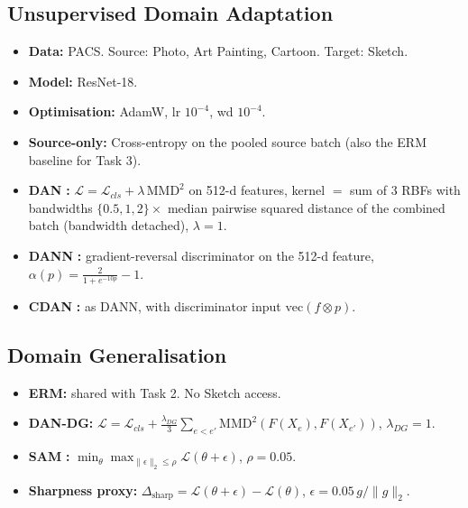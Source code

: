 \documentclass{article}
\newenvironment{tight}{\begin{itemize}\setlength{\itemsep}{0pt}\setlength{\parsep}{0pt}\setlength{\topsep}{2pt}\setlength{\parskip}{0pt}}{\end{itemize}}
\begin{document}
\subsection{Unsupervised Domain Adaptation}
\begin{tight}
  \item \textbf{Data:} PACS. Source: Photo, Art Painting, Cartoon. Target: Sketch.
  \item \textbf{Model:} ResNet-18.
  \item \textbf{Optimisation:} AdamW, lr $10^{-4}$, wd $10^{-4}$.
  \item \textbf{Source-only:} Cross-entropy on the pooled source batch (also the ERM baseline for Task 3).
  \item \textbf{DAN} \citep{long2015dan}\textbf{:} $\mathcal{L}=\mathcal{L}_{cls}+\lambda\,\mathrm{MMD}^2$ on 512-d features, kernel $=$ sum of 3 RBFs with bandwidths $\{0.5,1,2\}\times$ median pairwise squared distance of the combined batch (bandwidth detached), $\lambda=1$.
  \item \textbf{DANN} \citep{ganin2016dann}\textbf{:} gradient-reversal discriminator on the 512-d feature, $\alpha(p)=\frac{2}{1+e^{-10p}}-1$.
  \item \textbf{CDAN} \citep{long2018cdan}\textbf{:} as DANN, with discriminator input $\mathrm{vec}(f\otimes p)$.
\end{tight}

\subsection{Domain Generalisation}
\begin{tight}
  \item \textbf{ERM:} shared with Task 2. No Sketch access.
  \item \textbf{DAN-DG:} $\mathcal{L}=\mathcal{L}_{cls}+\frac{\lambda_{DG}}{3}\sum_{e<e'}\mathrm{MMD}^2(F(X_e),F(X_{e'}))$, $\lambda_{DG}=1$.
  \item \textbf{SAM} \citep{foret2021sam}\textbf{:} $\min_\theta\max_{\lVert\epsilon\rVert_2\le\rho}\mathcal{L}(\theta+\epsilon)$, $\rho=0.05$.
  \item \textbf{Sharpness proxy:} $\Delta_{\mathrm{sharp}}=\mathcal{L}(\theta+\epsilon)-\mathcal{L}(\theta)$, $\epsilon=0.05\,g/\lVert g\rVert_2$.
\end{tight}
\end{document}

